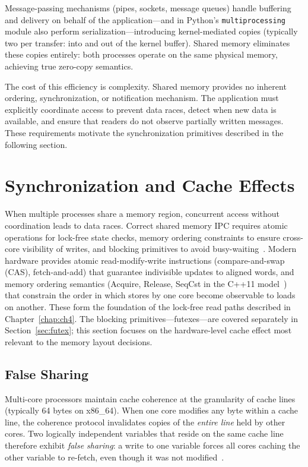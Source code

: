 Message-passing mechanisms (pipes, sockets, message queues) handle buffering and delivery on behalf of the application---and in Python's \texttt{multiprocessing} module also perform serialization---introducing kernel-mediated copies (typically two per transfer: into and out of the kernel buffer). Shared memory eliminates these copies entirely: both processes operate on the same physical memory, achieving true zero-copy semantics.

The cost of this efficiency is complexity. Shared memory provides no inherent ordering, synchronization, or notification mechanism. The application must explicitly coordinate access to prevent data races, detect when new data is available, and ensure that readers do not observe partially written messages. These requirements motivate the synchronization primitives described in the following section.


\section{Synchronization and Cache Effects}
\label{sec:sync}

When multiple processes share a memory region, concurrent access without coordination leads to data races. Correct shared memory IPC requires atomic operations for lock-free state checks, memory ordering constraints to ensure cross-core visibility of writes, and blocking primitives to avoid busy-waiting~\cite{herlihy2012}. Modern hardware provides atomic read-modify-write instructions (compare-and-swap (CAS), fetch-and-add) that guarantee indivisible updates to aligned words, and memory ordering semantics (Acquire, Release, SeqCst in the C++11 model~\cite{boehm2008}) that constrain the order in which stores by one core become observable to loads on another. These form the foundation of the lock-free read paths described in Chapter~\ref{chap:ch4}. The blocking primitives---futexes---are covered separately in Section~\ref{sec:futex}; this section focuses on the hardware-level cache effect most relevant to the memory layout decisions.

\subsection{False Sharing}
\label{subsec:false_sharing}

Multi-core processors maintain cache coherence at the granularity of cache lines (typically 64 bytes on x86\_64). When one core modifies any byte within a cache line, the coherence protocol invalidates copies of the \textit{entire line} held by other cores. Two logically independent variables that reside on the same cache line therefore exhibit \textit{false sharing}: a write to one variable forces all cores caching the other variable to re-fetch, even though it was not modified~\cite{herlihy2012}.

